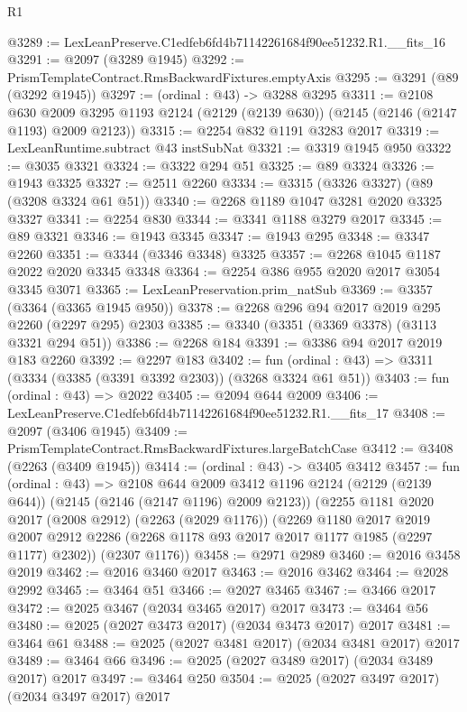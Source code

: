 \begin{lexlean}{R1}
\begin{coremodule}
@3289 := LexLeanPreserve.C1edfeb6fd4b71142261684f90ee51232.R1.__fits_16
@3291 := @2097 (@3289 @1945)
@3292 := PrismTemplateContract.RmsBackwardFixtures.emptyAxis
@3295 := @3291 (@89 (@3292 @1945))
@3297 := (ordinal : @43) -> @3288 @3295
@3311 := @2108
    @630
    @2009
    @3295
    @1193
    @2124
    (@2129 (@2139 @630))
    (@2145 (@2146 (@2147 @1193) @2009 @2123))
@3315 := @2254 @832 @1191 @3283 @2017
@3319 := LexLeanRuntime.subtract @43 instSubNat
@3321 := @3319 @1945 @950
@3322 := @3035 @3321
@3324 := @3322 @294 @51
@3325 := @89 @3324
@3326 := @1943 @3325
@3327 := @2511 @2260
@3334 := @3315 (@3326 @3327) (@89 (@3208 @3324 @61 @51))
@3340 := @2268 @1189 @1047 @3281 @2020 @3325 @3327
@3341 := @2254 @830
@3344 := @3341 @1188 @3279 @2017
@3345 := @89 @3321
@3346 := @1943 @3345
@3347 := @1943 @295
@3348 := @3347 @2260
@3351 := @3344 (@3346 @3348) @3325
@3357 := @2268 @1045 @1187 @2022 @2020 @3345 @3348
@3364 := @2254 @386 @955 @2020 @2017 @3054 @3345 @3071
@3365 := LexLeanPreservation.prim_natSub
@3369 := @3357 (@3364 (@3365 @1945 @950))
@3378 := @2268 @296 @94 @2017 @2019 @295 @2260 (@2297 @295) @2303
@3385 := @3340 (@3351 (@3369 @3378) (@3113 @3321 @294 @51))
@3386 := @2268 @184
@3391 := @3386 @94 @2017 @2019 @183 @2260
@3392 := @2297 @183
@3402 := fun (ordinal : @43) => @3311 (@3334 (@3385 (@3391 @3392 @2303)) (@3268 @3324 @61 @51))
@3403 := fun (ordinal : @43) => @2022
@3405 := @2094 @644 @2009
@3406 := LexLeanPreserve.C1edfeb6fd4b71142261684f90ee51232.R1.__fits_17
@3408 := @2097 (@3406 @1945)
@3409 := PrismTemplateContract.RmsBackwardFixtures.largeBatchCase
@3412 := @3408 (@2263 (@3409 @1945))
@3414 := (ordinal : @43) -> @3405 @3412
@3457 := fun (ordinal : @43) =>
  @2108
    @644
    @2009
    @3412
    @1196
    @2124
    (@2129 (@2139 @644))
    (@2145 (@2146 (@2147 @1196) @2009 @2123))
    (@2255
      @1181
      @2020
      @2017
      (@2008 @2912)
      (@2263 (@2029 @1176))
      (@2269
        @1180
        @2017
        @2019
        @2007
        @2912
        @2286
        (@2268 @1178 @93 @2017 @2017 @1177 @1985 (@2297 @1177) @2302))
      (@2307 @1176))
@3458 := @2971 @2989
@3460 := @2016 @3458 @2019
@3462 := @2016 @3460 @2017
@3463 := @2016 @3462
@3464 := @2028 @2992
@3465 := @3464 @51
@3466 := @2027 @3465
@3467 := @3466 @2017
@3472 := @2025 @3467 (@2034 @3465 @2017) @2017
@3473 := @3464 @56
@3480 := @2025 (@2027 @3473 @2017) (@2034 @3473 @2017) @2017
@3481 := @3464 @61
@3488 := @2025 (@2027 @3481 @2017) (@2034 @3481 @2017) @2017
@3489 := @3464 @66
@3496 := @2025 (@2027 @3489 @2017) (@2034 @3489 @2017) @2017
@3497 := @3464 @250
@3504 := @2025 (@2027 @3497 @2017) (@2034 @3497 @2017) @2017

\end{coremodule}
\end{lexlean}
